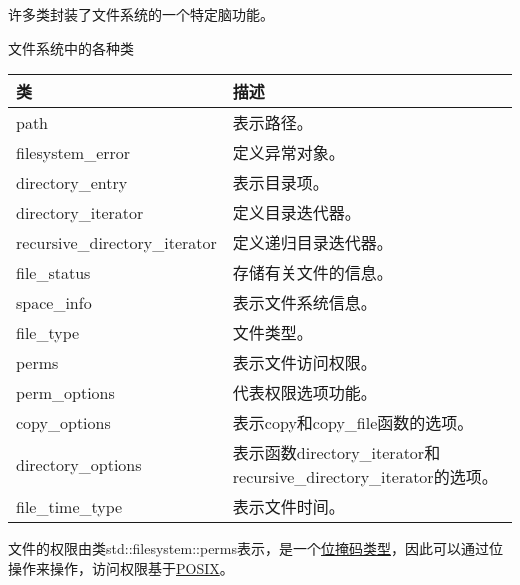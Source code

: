 许多类封装了文件系统的一个特定脑功能。

\begin{center}
文件系统中的各种类
\end{center}

\begin{longtable}[c]{|l|l|}
\hline
\textbf{类}                 & \textbf{描述}                                      \\ \hline
\endfirsthead
%
\endhead
%
path                           & 表示路径。                                        \\ \hline
filesystem\_error              & 定义异常对象。                              \\ \hline
directory\_entry               & 表示目录项。                             \\ \hline
directory\_iterator            & 定义目录迭代器。                             \\ \hline
recursive\_directory\_iterator & 定义递归目录迭代器。                   \\ \hline
file\_status                   & 存储有关文件的信息。                        \\ \hline
space\_info                    & 表示文件系统信息。                        \\ \hline
file\_type                     & 文件类型。                            \\ \hline
perms                          & 表示文件访问权限。                       \\ \hline
perm\_options                  & 代表权限选项功能。          \\ \hline
copy\_options                  & 表示copy和copy\_file函数的选项。 \\ \hline
directory\_options & 表示函数directory\_iterator和recursive\_directory\_iterator的选项。 \\ \hline
file\_time\_type               & 表示文件时间。                                     \\ \hline
\end{longtable}



文件的权限由类std::filesystem::perms表示，是一个\href{http://en.cppreference.com/w/cpp/concept/BitmaskType}{位掩码类型}，因此可以通过位操作来操作，访问权限基于\href{https://en.wikipedia.org/wiki/POSIX}{POSIX}。

